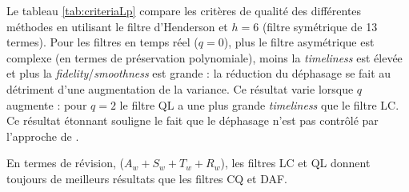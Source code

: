\documentclass[
  11pt,
  french,
  a4paper]{article}
\newcommand\1{\mathds{1}}
\begin{document}
Le tableau \ref{tab:criteriaLp} compare les critères de qualité des différentes méthodes en utilisant le filtre d'Henderson et \(h=6\) (filtre symétrique de 13 termes).
Pour les filtres en temps réel (\(q=0\)), plus le filtre asymétrique est complexe (en termes de préservation polynomiale), moins la \emph{timeliness} est élevée et plus la \emph{fidelity}/\emph{smoothness} est grande : la réduction du déphasage se fait au détriment d'une augmentation de la variance.
Ce résultat varie lorsque \(q\) augmente : pour \(q=2\) le filtre QL a une plus grande \emph{timeliness} que le filtre LC.
Ce résultat étonnant souligne le fait que le déphasage n'est pas contrôlé par l'approche de \textcite{proietti2008}.

En termes de révision, (\(A_w+S_w+T_w+R_w\)), les filtres LC et QL donnent toujours de meilleurs résultats que les filtres CQ et DAF.
\end{document}

